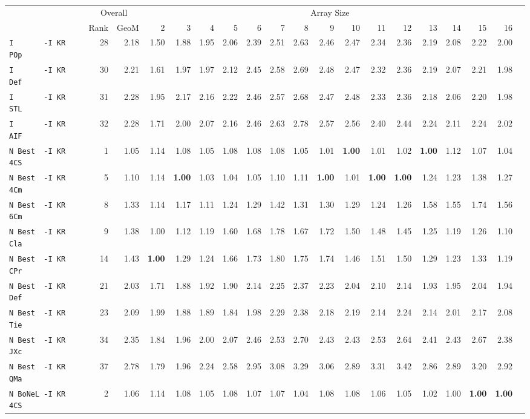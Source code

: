 \begin{tabular}{l | r @{~~} r | r@{~~}r@{~~}r@{~~}r@{~~}r@{~~}r@{~~}r@{~~}r@{~~}r@{~~}r@{~~}r@{~~}r@{~~}r@{~~}r@{~~}r@{~~}r|}
 & \multicolumn{2}{c|}{Overall} & \multicolumn{15}{c}{Array Size} \\
 & Rank & GeoM & 2&3&4&5&6&7&8&9&10&11&12&13&14&15&16\\ \hline
\verb+I       -I KR POp+ & 28 & 2.18 & 1.50&1.88&1.95&2.06&2.39&2.51&2.63&2.46&2.47&2.34&2.36&2.19&2.08&2.22&2.00\\
\verb+I       -I KR Def+ & 30 & 2.21 & 1.61&1.97&1.97&2.12&2.45&2.58&2.69&2.48&2.47&2.32&2.36&2.19&2.07&2.21&1.98\\
\verb+I       -I KR STL+ & 31 & 2.28 & 1.95&2.17&2.16&2.22&2.46&2.57&2.68&2.47&2.48&2.33&2.36&2.18&2.06&2.20&1.98\\
\verb+I       -I KR AIF+ & 32 & 2.28 & 1.71&2.00&2.07&2.16&2.46&2.63&2.78&2.57&2.56&2.40&2.44&2.24&2.11&2.24&2.02\smallskip \\
\verb+N Best  -I KR 4CS+ & 1 & 1.05 & 1.14&1.08&1.05&1.08&1.08&1.08&1.05&1.01&\textbf{1.00}&1.01&1.02&\textbf{1.00}&1.12&1.07&1.04\\
\verb+N Best  -I KR 4Cm+ & 5 & 1.10 & 1.14&\textbf{1.00}&1.03&1.04&1.05&1.10&1.11&\textbf{1.00}&1.01&\textbf{1.00}&\textbf{1.00}&1.24&1.23&1.38&1.27\\
\verb+N Best  -I KR 6Cm+ & 8 & 1.33 & 1.14&1.17&1.11&1.24&1.29&1.42&1.31&1.30&1.29&1.24&1.26&1.58&1.55&1.74&1.56\\
\verb+N Best  -I KR Cla+ & 9 & 1.38 & 1.00&1.12&1.19&1.60&1.68&1.78&1.67&1.72&1.50&1.48&1.45&1.25&1.19&1.26&1.10\\
\verb+N Best  -I KR CPr+ & 14 & 1.43 & \textbf{1.00}&1.29&1.24&1.66&1.73&1.80&1.75&1.74&1.46&1.51&1.50&1.29&1.23&1.33&1.19\\
\verb+N Best  -I KR Def+ & 21 & 2.03 & 1.71&1.88&1.92&1.90&2.14&2.25&2.37&2.23&2.04&2.10&2.14&1.93&1.95&2.04&1.94\\
\verb+N Best  -I KR Tie+ & 23 & 2.09 & 1.99&1.88&1.89&1.84&1.98&2.29&2.38&2.18&2.19&2.14&2.24&2.14&2.01&2.17&2.08\\
\verb+N Best  -I KR JXc+ & 34 & 2.35 & 1.84&1.96&2.00&2.07&2.46&2.53&2.70&2.43&2.43&2.53&2.64&2.41&2.43&2.67&2.38\\
\verb+N Best  -I KR QMa+ & 37 & 2.78 & 1.79&1.96&2.24&2.58&2.95&3.08&3.29&3.06&2.89&3.31&3.42&2.86&2.89&3.20&2.92\smallskip \\
\verb+N BoNeL -I KR 4CS+ & 2 & 1.06 & 1.14&1.08&1.05&1.08&1.07&1.07&1.04&1.08&1.08&1.06&1.05&1.02&1.00&\textbf{1.00}&\textbf{1.00}\\

\end{tabular}
